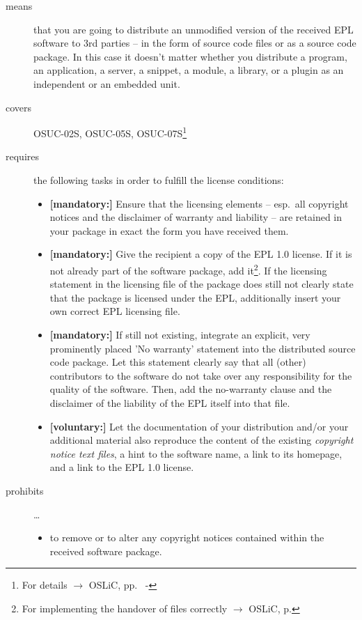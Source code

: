 \begin{description}

\item[means] that you are going to distribute an unmodified version of the
received EPL software to 3rd parties -- in the form of source code files or as a
source code package. In this case it doesn't matter whether you distribute a
program, an application, a server, a snippet, a module, a library, or a plugin
as an independent or an embedded unit.

\item[covers] OSUC-02S, OSUC-05S, OSUC-07S\footnote{For details $\rightarrow$
OSLiC, pp.\ \pageref{OSUC-02S-DEF} - \pageref{OSUC-07S-DEF}}

\item[requires] the following tasks in order to fulfill the license conditions:
\begin{itemize}
  
  \item \textbf{[mandatory:]} Ensure that the licensing elements -- esp.\ all
  copyright notices and the disclaimer of warranty and liability -- are retained
  in your package in exact the form you have received them.
  
  \item \textbf{[mandatory:]} Give the recipient a copy of the EPL 1.0 license.
  If it is not already part of the software package, add it\footnote{For
  implementing the handover of files correctly $\rightarrow$ OSLiC, p.
  \pageref{DistributingFilesHint}}. If the licensing statement in the licensing
  file of the package does still not clearly state that the package is licensed
  under the EPL, additionally insert your own correct EPL licensing file.
  
  \item \textbf{[mandatory:]} If still not existing, integrate an explicit, very
  prominently placed 'No warranty' statement into the distributed source code
  package. Let this statement clearly say that all (other) contributors to the
  software do not take over any responsibility for the quality of the software.
  Then, add the no-warranty clause and the disclaimer of the liability of the
  EPL itself into that file.
  
  \item \textbf{[voluntary:]} Let the documentation of your distribution and/or
  your additional material also reproduce the content of the existing
  \emph{copyright notice text files}, a hint to the software name, a link to its
  homepage, and a link to the EPL 1.0 license.
\end{itemize}

\item[prohibits] \ldots
\begin{itemize}
  \item to remove or to alter any copyright notices contained within the
  received software package.
\end{itemize}

\end{description}


